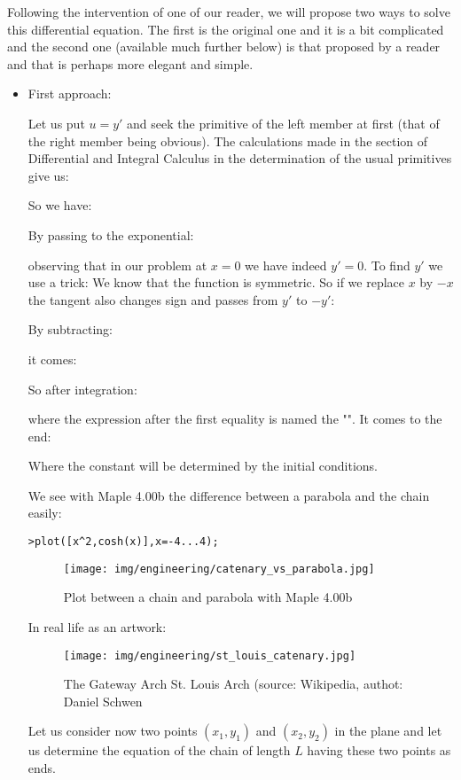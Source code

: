	Following the intervention of one of our reader, we will propose two ways to solve this differential equation. The first is the original one and it is a bit complicated and the second one (available much further below) is that proposed by a reader and that  is perhaps more elegant and simple.
	\begin{itemize}
		\item First approach:

		Let us put $u=y'$ and seek the primitive of the left member at first (that of the right member being obvious). The calculations made in the section of Differential and Integral Calculus in the determination of the usual primitives give us:
		
		So we have:
		
		By passing to the exponential:
		
		observing that in our problem at $x=0$ we have indeed $y'=0$.
		To find $y'$ we use a trick: We know that the function is symmetric. So if we replace $x$ by $-x$ the tangent also changes sign and passes from $y'$ to $-y'$:
		
		By subtracting:
		
		it comes:
		
		So after integration:
		
		where the expression after the first equality is named the "". It comes to the end:
		
		Where the constant will be determined by the initial conditions.
	
		We see with Maple 4.00b the difference between a parabola and the chain easily:
	
		\texttt{>plot([x\string^2,cosh(x)],x=-4...4);}
		\begin{figure}[H]
			\centering
			\texttt{[image: img/engineering/catenary\_vs\_parabola.jpg]}
			\caption{Plot between a chain and parabola with Maple 4.00b}
		\end{figure}
		In real life as an artwork:
		\begin{figure}[H]
			\centering
			\texttt{[image: img/engineering/st\_louis\_catenary.jpg]}
			\caption[The Gateway Arch St. Louis Arch]{The Gateway Arch St. Louis Arch (source: Wikipedia, authot: Daniel Schwen}
		\end{figure}
		Let us consider now two points $(x_1,y_1)$ and $(x_2,y_2)$ in the plane and let us determine the equation of the chain of length $L$ having these two points as ends.


\end{itemize}
